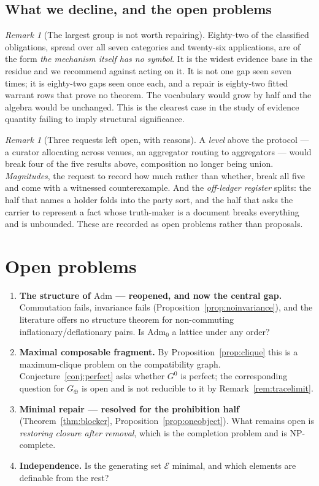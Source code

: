 \documentclass[11pt,reqno]{amsart}
\theoremstyle{plain}
\theoremstyle{definition}
\theoremstyle{remark}
\newtheorem{remark}[theorem]{Remark}
\newcommand{\Adm}{\mathrm{Adm}_{0}}
\newcommand{\Admf}{\mathrm{Adm}}
\newcommand{\El}{\mathcal{E}}
\begin{document}
\subsection{What we decline, and the open problems}

\begin{remark}[The largest group is not worth repairing]
Eighty-two of the classified obligations, spread over all seven categories and
twenty-six applications, are of the form \emph{the mechanism itself has no
symbol}. It is
the widest evidence base in the residue and we recommend against acting on it.
It is not one gap seen seven times; it is eighty-two gaps seen once each, and a
repair is eighty-two fitted warrant rows that prove no theorem. The vocabulary
would grow by half and the algebra would be unchanged. This is the clearest case
in the study of evidence quantity failing to imply structural significance.
\end{remark}

\begin{remark}[Three requests left open, with reasons]
A \emph{level} above the protocol --- a curator allocating across venues, an
aggregator routing to aggregators --- would break four of the five results
above, composition no longer being union. \emph{Magnitudes}, the request to
record how much rather than whether, break all five and come with a witnessed
counterexample. And the \emph{off-ledger register} splits: the half that names a
holder folds into the party sort, and the half that asks the carrier to
represent a fact whose truth-maker is a document breaks everything and is
unbounded. These are recorded as open problems rather than proposals.
\end{remark}

\section{Open problems}

\begin{enumerate}
  \item \textbf{The structure of $\Admf$ --- reopened, and now the central gap.}
    Commutation fails, invariance fails (Proposition~\ref{prop:noinvariance}),
    and the literature offers no structure theorem for non-commuting
    inflationary/deflationary pairs. Is $\Adm$ a lattice under any order?
  \item \textbf{Maximal composable fragment.} By
    Proposition~\ref{prop:clique} this is a maximum-clique problem on the
    compatibility graph. Conjecture~\ref{conj:perfect} asks whether $G^{0}$ is
    perfect; the corresponding question for $G_\oplus$ is open and is not
    reducible to it by Remark~\ref{rem:tracelimit}.
  \item \textbf{Minimal repair --- resolved for the prohibition half}
    (Theorem~\ref{thm:blocker}, Proposition~\ref{prop:oneobject}). What remains
    open is \emph{restoring closure after removal}, which is the completion
    problem and is NP-complete.
  \item \textbf{Independence.} Is the generating set $\El$ minimal, and which
    elements are definable from the rest?
\end{enumerate}
\end{document}
